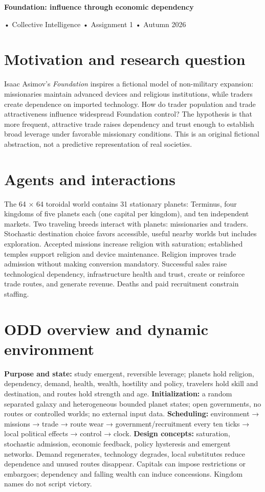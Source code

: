 \documentclass[10pt,a4paper]{article}
\newcommand{\reporttitle}[1]{{\Large\bfseries\color{teal}#1\par}\vspace{3pt}}
\begin{document}
\reporttitle{Foundation: influence through economic dependency}
{\footnotesize • Collective Intelligence • Assignment 1 • Autumn 2026\par}

\section*{Motivation and research question}

Isaac Asimov’s \emph{Foundation} inspires a fictional model of non-military expansion: missionaries maintain advanced devices and religious institutions, while traders create dependence on imported technology. How do trader population and trade attractiveness influence widespread Foundation control? The hypothesis is that more frequent, attractive trade raises dependency and trust enough to establish broad leverage under favorable missionary conditions. This is an original fictional abstraction, not a predictive representation of real societies.


\section*{Agents and interactions}

The 64 × 64 toroidal world contains 31 stationary planets: Terminus, four kingdoms of five planets each (one capital per kingdom), and ten independent markets. Two traveling breeds interact with planets: missionaries and traders. Stochastic destination choice favors accessible, useful nearby worlds but includes exploration. Accepted missions increase religion with saturation; established temples support religion and device maintenance. Religion improves trade admission without making conversion mandatory. Successful sales raise technological dependency, infrastructure health and trust, create or reinforce trade routes, and generate revenue. Deaths and paid recruitment constrain staffing.


\section*{ODD overview and dynamic environment}

\textbf{Purpose and state:} study emergent, reversible leverage; planets hold religion, dependency, demand, health, wealth, hostility and policy, travelers hold skill and destination, and routes hold strength and age. \textbf{Initialization:} a random separated galaxy and heterogeneous bounded planet states; open governments, no routes or controlled worlds; no external input data. \textbf{Scheduling:} environment → missions → trade → route wear → government/recruitment every ten ticks → local political effects → control → clock. \textbf{Design concepts:} saturation, stochastic admission, economic feedback, policy hysteresis and emergent networks. Demand regenerates, technology degrades, local substitutes reduce dependence and unused routes disappear. Capitals can impose restrictions or embargoes; dependency and falling wealth can induce concessions. Kingdom names do not script victory.
\end{document}
